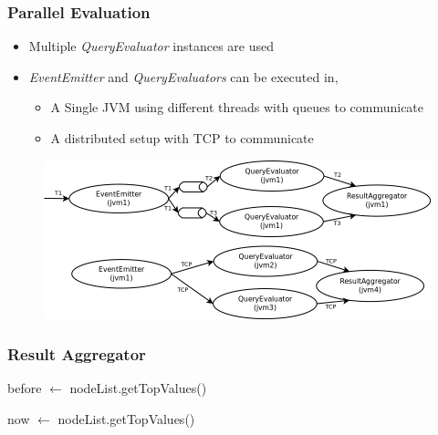 \documentclass[handout]{beamer}
\begin{document}
\begin{frame}
\frametitle{Parallel Evaluation}

\begin{itemize}
        \item Multiple \textit{QueryEvaluator} instances are used
        \item \textit{EventEmitter} and \textit{QueryEvaluators} can be executed in,
                \begin{itemize}
                        \item A Single JVM using different threads with queues to communicate
                        \item A distributed setup with TCP to communicate
                \end{itemize}
\end{itemize}

\begin{figure}
        \includegraphics[width=0.8\linewidth]{parallel.png}
\end{figure}

\end{frame}

\begin{frame}
\frametitle{Result Aggregator}

\begin{algorithm}[H]
\footnotesize
before $\gets$ nodeList.getTopValues()\;


now $\gets$ nodeList.getTopValues()\;

\end{algorithm}

\end{frame}
\end{document}

